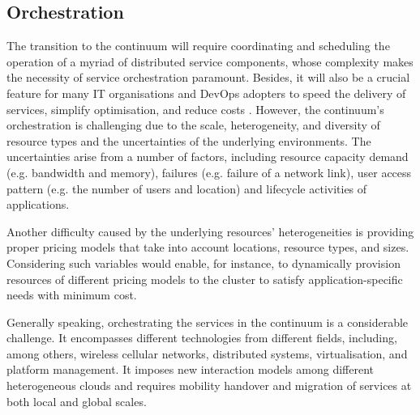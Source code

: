 
\subsection{Orchestration}

The transition to the continuum will require coordinating and scheduling the operation of a myriad of distributed service components, whose complexity makes the necessity of service orchestration paramount. Besides, it will also be a crucial feature for many IT organisations and DevOps adopters to speed the delivery of services, simplify optimisation, and reduce costs \cite{nygren2010akamai}. However, the continuum's orchestration is challenging due to the scale, heterogeneity, and diversity of resource types and the uncertainties of the underlying environments. The uncertainties arise from a number of factors, including resource capacity demand (e.g. bandwidth and memory), failures (e.g. failure of a network link), user access pattern (e.g. the number of users and location) and lifecycle activities of applications.

Another difficulty caused by the underlying resources' heterogeneities is providing proper pricing models that take into account locations, resource types, and sizes. Considering such variables would enable, for instance, to dynamically provision resources of different pricing models to the cluster to satisfy application-specific needs with minimum cost.

Generally speaking, orchestrating the services in the continuum is a considerable challenge. It encompasses different technologies from different fields, including, among others, wireless cellular networks, distributed systems, virtualisation, and platform management. It imposes new interaction models among different heterogeneous clouds and requires mobility handover and migration of services at both local and global scales.


